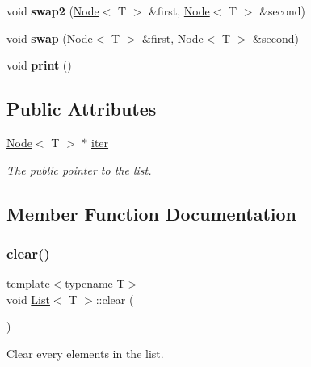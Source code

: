 \begin{DoxyCompactItemize}
\mbox{\label{classList_a8fb146e3a7ae88e7634065e57464c484}} 
void {\bfseries swap2} (\hyperlink{structNode}{Node}$<$ T $>$ \&first, \hyperlink{structNode}{Node}$<$ T $>$ \&second)
\item 
\mbox{\label{classList_a05c720c443e157c341c810decc9d9e01}} 
void {\bfseries swap} (\hyperlink{structNode}{Node}$<$ T $>$ \&first, \hyperlink{structNode}{Node}$<$ T $>$ \&second)
\item 
\mbox{\label{classList_a67760ff5954e207fc9aa8d537675b8a0}} 
void {\bfseries print} ()
\end{DoxyCompactItemize}
\subsection*{Public Attributes}
\begin{DoxyCompactItemize}
\item 
\hyperlink{structNode}{Node}$<$ T $>$ $\ast$ \hyperlink{classList_a36398f758397060735c8df9f7d11235d}{iter}
\begin{DoxyCompactList}\small\item\em The public pointer to the list. \end{DoxyCompactList}\end{DoxyCompactItemize}


\subsection{Member Function Documentation}
\mbox{\label{classList_ae296516a252e11963dbf963727ce429a}} 
\subsubsection{\texorpdfstring{clear()}{clear()}}
{\footnotesize\ttfamily template$<$typename T$>$ \\
void \hyperlink{classList}{List}$<$ T $>$\+::clear (\begin{DoxyParamCaption}{ }\end{DoxyParamCaption})\hspace{0.3cm}{\ttfamily [inline]}}



Clear every elements in the list. 

